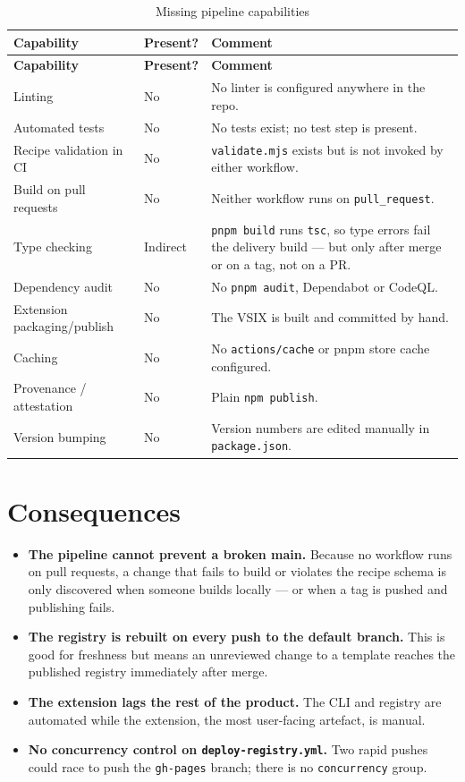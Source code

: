 \begin{longtable}{@{}L{4.6cm}L{2.2cm}L{7.4cm}@{}}
\caption{Missing pipeline capabilities}\\
\toprule
\textbf{Capability} & \textbf{Present?} & \textbf{Comment} \\
\midrule
\endfirsthead
\toprule
\textbf{Capability} & \textbf{Present?} & \textbf{Comment} \\
\midrule
\endhead
Linting & No & No linter is configured anywhere in the repo. \\
Automated tests & No & No tests exist; no test step is present. \\
Recipe validation in CI & No & \texttt{validate.mjs} exists but is not invoked by
either workflow. \\
Build on pull requests & No & Neither workflow runs on \texttt{pull\_request}. \\
Type checking & Indirect & \texttt{pnpm build} runs \texttt{tsc}, so type errors
fail the delivery build --- but only after merge or on a tag, not on a PR. \\
Dependency audit & No & No \texttt{pnpm audit}, Dependabot or CodeQL. \\
Extension packaging/publish & No & The VSIX is built and committed by hand. \\
Caching & No & No \texttt{actions/cache} or pnpm store cache configured. \\
Provenance / attestation & No & Plain \texttt{npm publish}. \\
Version bumping & No & Version numbers are edited manually in
\texttt{package.json}. \\
\bottomrule
\end{longtable}

\section{Consequences}

\begin{itemize}
  \item \textbf{The pipeline cannot prevent a broken main.} Because no workflow
        runs on pull requests, a change that fails to build or violates the
        recipe schema is only discovered when someone builds locally --- or when
        a tag is pushed and publishing fails.
  \item \textbf{The registry is rebuilt on every push to the default branch.}
        This is good for freshness but means an unreviewed change to a template
        reaches the published registry immediately after merge.
  \item \textbf{The extension lags the rest of the product.} The CLI and registry
        are automated while the extension, the most user-facing artefact, is
        manual.
  \item \textbf{No concurrency control on \texttt{deploy-registry.yml}.} Two rapid
        pushes could race to push the \texttt{gh-pages} branch; there is no
        \texttt{concurrency} group.
\end{itemize}

